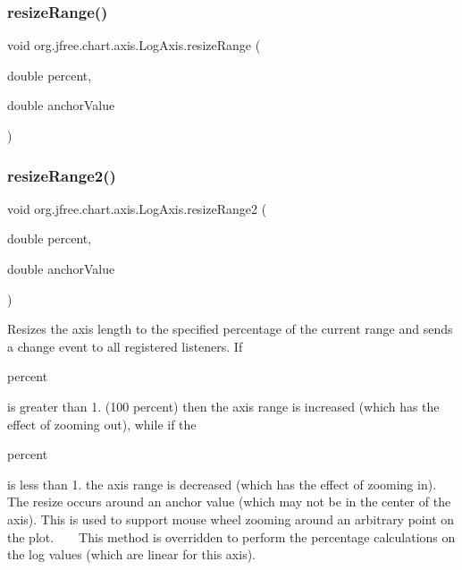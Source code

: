 \subsubsection{\texorpdfstring{resize\+Range()}{resizeRange()}\hspace{0.1cm}{\footnotesize\ttfamily [2/2]}}
{\footnotesize\ttfamily void org.\+jfree.\+chart.\+axis.\+Log\+Axis.\+resize\+Range (\begin{DoxyParamCaption}\item[{double}]{percent,  }\item[{double}]{anchor\+Value }\end{DoxyParamCaption})}

\mbox{\label{classorg_1_1jfree_1_1chart_1_1axis_1_1_log_axis_ae4b89baaadc62724e2281aec612d5163}} 
\subsubsection{\texorpdfstring{resize\+Range2()}{resizeRange2()}}
{\footnotesize\ttfamily void org.\+jfree.\+chart.\+axis.\+Log\+Axis.\+resize\+Range2 (\begin{DoxyParamCaption}\item[{double}]{percent,  }\item[{double}]{anchor\+Value }\end{DoxyParamCaption})}

Resizes the axis length to the specified percentage of the current range and sends a change event to all registered listeners. If 
\begin{DoxyCode}
percent 
\end{DoxyCode}
 is greater than 1. (100 percent) then the axis range is increased (which has the effect of zooming out), while if the 
\begin{DoxyCode}
percent 
\end{DoxyCode}
 is less than 1. the axis range is decreased (which has the effect of zooming in). The resize occurs around an anchor value (which may not be in the center of the axis). This is used to support mouse wheel zooming around an arbitrary point on the plot. ~\newline
~\newline
 This method is overridden to perform the percentage calculations on the log values (which are linear for this axis).


